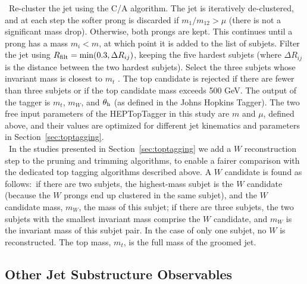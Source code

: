 ~Re-cluster the jet using the C/A algorithm. The jet is iteratively de-clustered, and at each step the softer prong is discarded if $m_1/m_{12}>\mu$ (there is not a significant mass drop). Otherwise, both prongs are kept. This continues until a prong has a mass $m_i < m$, at which point it is added to the list of subjets. Filter the jet using $R_{\rm filt}=\mathrm{min}(0.3,\Delta R_{ij})$, keeping the five hardest subjets (where $\Delta R_{ij}$ is the distance between the two hardest subjets). Select the three subjets whose invariant mass is closest to $m_t$ \cite{Plehn:2010st}. The top candidate is rejected if there are fewer than three subjets or if the top candidate mass exceeds 500 GeV. The output of the tagger is $m_t$, $m_W$, and $\theta_{\rm h}$ (as defined in the Johns Hopkins Tagger). The two free input parameters of the HEPTopTagger in this study are $m$ and $\mu$, defined above, and their values are optimized for different jet kinematics and parameters in Section~\ref{sec:toptagging}.\\

~In the studies presented in Section~\ref{sec:toptagging} we add a $W$ reconstruction step to the pruning and trimming algorithms, to enable a fairer comparison with the dedicated top tagging algorithms described above. A $W$ candidate is found as follows:~if there are two subjets, the highest-mass subjet is the $W$ candidate (because the $W$ prongs end up clustered in the same subjet), and the $W$ candidate mass, $m_W$, the mass of this subjet; if there are three subjets, the two subjets with the smallest invariant mass comprise the $W$ candidate, and $m_W$ is the invariant mass of this subjet pair. In the case of only one subjet, no $W$ is reconstructed. The top mass, $m_t$, is the full mass of the groomed jet.\\


\subsection{Other Jet Substructure Observables} \label{sec:substructure}

